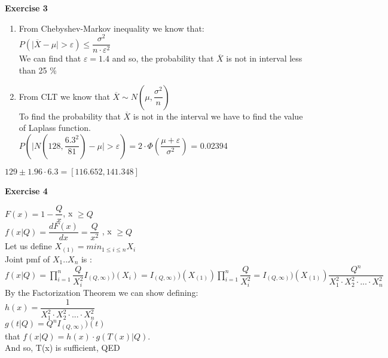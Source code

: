 \documentclass[12pt]{article}
\begin{document}
\textbf{Exercise 3}

\begin{list}{()~}{}
\item
\begin{enumerate}
\item
From Chebyshev-Markov inequality we know that:\\
$P\left( \vert \overline{X} - \mu \vert > \varepsilon \right) \leq \dfrac{\sigma^2}{n \cdot \varepsilon^2}$\\
We can find that $\varepsilon = 1.4$ and so, the probability that $\overline{X}$ is not in interval less than 25 \%
\item
From CLT we know that $\overline{X} \sim N\left( \mu, \dfrac{\sigma^2}{n} \right)$\\
To find the probability that $\overline{X}$ is not in the interval we have to find the value of Laplass function.\\
$P\left( \vert N(128, \dfrac{6.3^2}{81}) - \mu   \vert > \varepsilon \right) = 2 \cdot \Phi\left(\dfrac{\mu + \varepsilon}{\sigma^2}\right)$ = 0.02394
\end{enumerate}
\item
$129 \pm 1.96 \cdot 6.3 = [116.652, 141.348] $
\end{list}
\medskip

\medskip		

\textbf{Exercise 4}

$F(x) = 1 - \dfrac{Q}{x}$, x $\geq Q$\\
$f(x \vert Q) = \dfrac{d F(x)}{dx} = \dfrac{Q}{x^2}$ ,  x $\geq Q$\\
Let us define $X_{(1)} = min_{1 \leq i \leq n}X_i$\\
Joint pmf of $X_1..X_n$ is :\\
$f(x \vert Q) = \prod^n_{i = 1} \dfrac{Q}{X^2_i} I_{(Q, \infty)})(X_i) = I_{(Q, \infty)})(X_{(1)}) \prod^n_{i = 1} \dfrac{Q}{X^2_i} = I_{(Q, \infty)})(X_{(1)}) \dfrac{Q^n}{X^2_1 \cdot X^2_2 \cdot ... \cdot X^2_n }$\\

By the Factorization Theorem we can show defining:\\
$h(x) = \dfrac{1}{X^2_1 \cdot X^2_2 \cdot ... \cdot X^2_n }$\\
$g(t | Q) = Q^n  I_{(Q, \infty)})(t)$\\
that  $f(x \vert Q) = h(x) \cdot g(T(x) | Q)$.\\
And so, T(x) is sufficient, QED
\medskip
\end{document}
